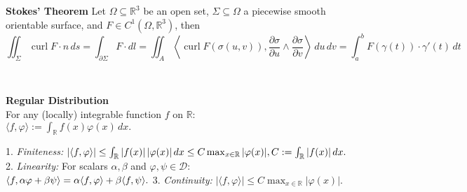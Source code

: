 \documentclass[8pt]{article}
\begin{document}
\hfill
\begin{minipage}[htp]{0.49\textwidth}
  \vspace{-10px}
\noindent\textbf{Stokes' Theorem}
Let \( \Omega \subseteq \mathbb{R}^3 \) be an open set, \( \Sigma \subseteq \Omega \) a piecewise smooth orientable surface, and \( F \in C^1(\Omega, \mathbb{R}^3) \), then
\vspace{-10px}
\[
\iint_{\Sigma} \operatorname{curl} F \cdot n \, ds
= \int_{\partial \Sigma} F \cdot dl
= \iint_{A} \left\langle \operatorname{curl} F(\sigma(u,v)), \frac{\partial \sigma}{\partial u} \wedge \frac{\partial \sigma}{\partial v} \right\rangle \, du \, dv
= \int_{a}^{b} F(\gamma(t)) \cdot \gamma'(t) \, dt
\]


\end{minipage}\\ \vfill
\begin{minipage}[t]{0.5\textwidth}
  \small
  \noindent \textbf{Regular Distribution}\\
  For any (locally) integrable function \(f\) on \(\mathbb{R}\):\\
 $
  \langle f, \varphi\rangle := \int_{\mathbb{R}} f(x)\varphi(x)\,dx.
  $

  1. \emph{Finiteness:}
$
  |\langle f, \varphi\rangle| \leq \int_{\mathbb{R}} |f(x)|\,|\varphi(x)|\,dx \leq C \max_{x \in \mathbb{R}}|\varphi(x)|, \\
  C := \int_{\mathbb{R}} |f(x)|\,dx.
$\\
  2. \emph{Linearity:} For scalars \(\alpha, \beta\) and \(\varphi, \psi \in \mathcal{D}\): \\
$
  \langle f, \alpha \varphi + \beta \psi\rangle = \alpha \langle f, \varphi\rangle + \beta \langle f, \psi\rangle. \\
$
  3. \emph{Continuity:}
$
  |\langle f, \varphi\rangle| \leq C \max_{x \in \mathbb{R}}|\varphi(x)|.
$
\end{minipage}
\hfill
\hspace{-10px}
\end{document}

